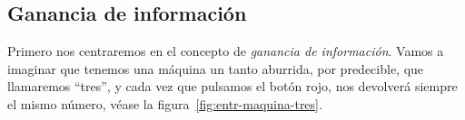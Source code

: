\subsection{Ganancia de información}
Primero nos centraremos en el concepto de \emph{ganancia de información}.
Vamos a imaginar que tenemos una máquina un tanto aburrida, por predecible,
que llamaremos ``tres'', y cada vez que pulsamos el botón rojo, nos devolverá
siempre el mismo número, véase la figura~\ref{fig:entr-maquina-tres}.
\begin{figure}[ht]
  \centering
  \newcommand{\colorMaquinaInt}{green!70!black!40}
  \newcommand{\colorMaquinaExt}{black}
  \newcommand{\colorEtiquetaInt}{green!70!black!35}
  \newcommand{\colorEtiquetaExt}{green!45!black}
  \newcommand{\colorBotonInt}{red}
  \newcommand{\colorBotonExt}{black}
  \newcommand{\colorFlechaSalida}{black!60}
  \newcommand{\colorNumeroInt}{orange!40}
  \newcommand{\colorNumeroExt}{black!60}
  \def\scl{1}


\end{figure}
